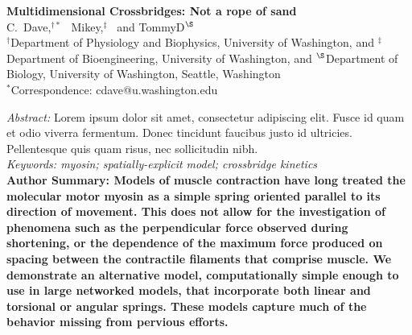 \documentclass[11pt]{article}
\begin{document}
{\selectfont
\noindent \LARGE \textbf{
Multidimensional Crossbridges: Not a rope of sand }\\

	\large \noindent 
    C.~Dave,$^{\dagger \ast}$~
	Mikey,$^\ddagger$~
	and TommyD$^\S$\\ 
	\small 
	$^\dagger$Department of Physiology and Biophysics, University of Washington, and 
	$^\ddagger$Department of Bioengineering, University of Washington, and 
	$^\S$Department of Biology, University of Washington, Seattle, Washington \\
	$^\ast$Correspondence: cdave@u.washington.edu \\
	\normalsize


\noindent \emph{Abstract:} 
Lorem ipsum dolor sit amet, consectetur adipiscing elit. Fusce id quam et odio viverra fermentum. Donec tincidunt faucibus justo id ultricies. Pellentesque quis quam risus, nec sollicitudin nibh. \\[.5em]
{\footnotesize \emph{
Keywords: myosin; spatially-explicit model; crossbridge kinetics}} \\[.5em]
{\footnotesize \textbf{
Author Summary: 
Models of muscle contraction have long treated the molecular motor myosin as a simple spring oriented parallel to its direction of movement. This does not allow for the investigation of phenomena such as the perpendicular force observed during shortening, or the dependence of the maximum force produced on spacing between the contractile filaments that comprise muscle. We demonstrate an alternative model, computationally simple enough to use in large networked models, that incorporate both linear and torsional or angular springs. These models capture much of the behavior missing from pervious efforts.}}} \\
\end{document}
